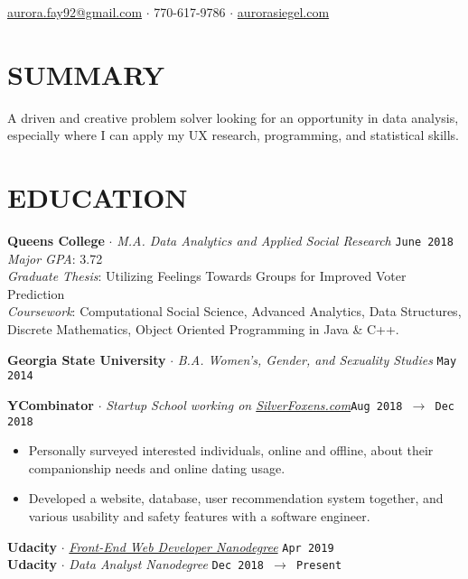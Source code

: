 \documentclass[margin, line, 11pt]{res}
\begin{document}
\noindent\hspace{-1.0in}{\LARGE\bf Aurora Siegel}
\hfill \href{mailto:aurora.fay92@gmail.com}{aurora.fay92@gmail.com}
$\cdot$ 770-617-9786
$\cdot$ \href{http://aurorasiegel.com}{aurorasiegel.com}

\begin{resume}

\section{SUMMARY}

A driven and creative problem solver looking for an opportunity in data analysis, especially where I can apply my UX research, programming, and statistical skills. 

\section{EDUCATION}

{\bf Queens College} $\cdot$ {\it M.A. Data Analytics and Applied Social Research} \hfill \texttt{June 2018}
\\{\it  Major GPA}: 3.72
\\{\it Graduate Thesis}: Utilizing Feelings Towards Groups for Improved Voter Prediction
\\{\it Coursework}: Computational Social Science, Advanced Analytics, Data Structures, Discrete 
Mathematics, Object Oriented Programming in Java \& C++.

{\bf Georgia State University} $\cdot$ {\it B.A. Women's, Gender, and Sexuality Studies} \hfill \texttt{May 2014}

{\bf YCombinator} $\cdot$ {\it Startup School working on \href{http://silverfoxens.com}{SilverFoxens.com}}\hfill \texttt{Aug 2018 $\rightarrow$ Dec 2018}
\begin{itemize}
  \item Personally surveyed interested individuals, online and offline, about their companionship needs and online dating usage.
  \item Developed a website, database, user recommendation system together, and various usability and safety features with a software engineer.
\end{itemize}
{\bf Udacity} $\cdot$ {\it \href{https://confirm.udacity.com/VUHFGNF6}{Front-End Web Developer Nanodegree}} \hfill \texttt{Apr 2019}
\\ {\bf Udacity} $\cdot$ {\it Data Analyst Nanodegree} \hfill \texttt{Dec 2018 $\rightarrow$  Present}


\end{resume}
\end{document}

